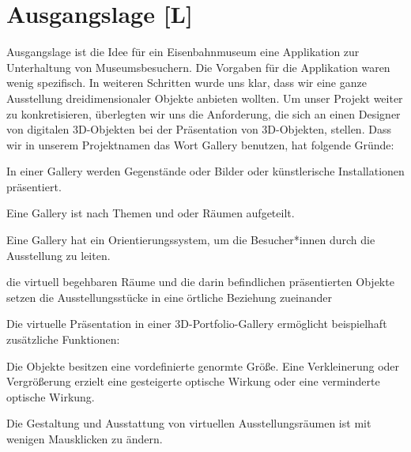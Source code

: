 \section{Ausgangslage [L]}
Ausgangslage ist die Idee für ein Eisenbahnmuseum eine Applikation zur Unterhaltung von Museumsbesuchern. Die Vorgaben für die Applikation waren wenig spezifisch. In weiteren Schritten wurde uns klar, dass wir eine ganze Ausstellung dreidimensionaler Objekte anbieten wollten. Um unser Projekt weiter zu konkretisieren, überlegten wir uns die Anforderung, die sich an einen Designer von digitalen 3D-Objekten bei der Präsentation von 3D-Objekten, stellen.
Dass wir in unserem Projektnamen das Wort Gallery benutzen, hat folgende Gründe:
\begin{compactitem}
    \item In einer Gallery werden Gegenstände oder Bilder oder künstlerische Installationen präsentiert.
    \item Eine Gallery ist nach Themen und oder Räumen aufgeteilt.
    \item Eine Gallery hat ein Orientierungssystem, um die Besucher*innen durch die Ausstellung zu leiten.
    \item die virtuell begehbaren Räume und die darin befindlichen präsentierten Objekte setzen die Ausstellungsstücke in eine örtliche Beziehung zueinander
\end{compactitem}


Die virtuelle Präsentation in einer 3D-Portfolio-Gallery ermöglicht beispielhaft zusätzliche Funktionen:
\begin{compactitem}
    \item Die Objekte besitzen eine vordefinierte genormte Größe. Eine Verkleinerung oder Vergrößerung erzielt eine gesteigerte optische Wirkung oder eine verminderte optische Wirkung.
    \item Die Gestaltung und Ausstattung von virtuellen Ausstellungsräumen ist mit wenigen Mausklicken zu ändern.
\end{compactitem}


